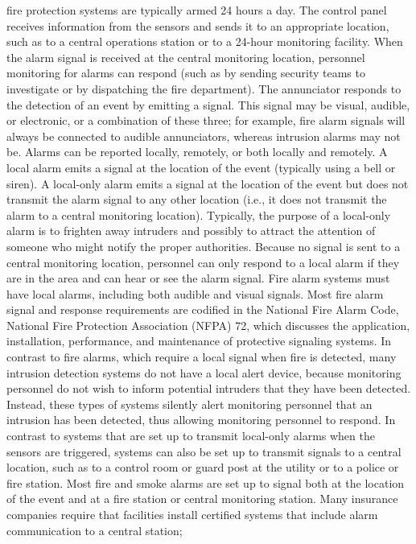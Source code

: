 \documentclass{article}
\begin{document}
fire protection systems are typically armed 24 hours a day. The control
panel receives information from the sensors and sends it to an
appropriate location, such as to a central operations station or to a
24-hour monitoring facility. When the alarm signal is received at the
central monitoring location, personnel monitoring for alarms can respond
(such as by sending security teams to investigate or by dispatching the
fire department). The annunciator responds to the detection of an event
by emitting a signal. This signal may be visual, audible, or electronic,
or a combination of these three; for example, fire alarm signals will
always be connected to audible annunciators, whereas intrusion alarms
may not be. Alarms can be reported locally, remotely, or both locally
and remotely. A local alarm emits a signal at the location of the event
(typically using a bell or siren). A local-only alarm emits a signal at
the location of the event but does not transmit the alarm signal to any
other location (i.e., it does not transmit the alarm to a central
monitoring location). Typically, the purpose of a local-only alarm is to
frighten away intruders and possibly to attract the attention of someone
who might notify the proper authorities. Because no signal is sent to a
central monitoring location, personnel can only respond to a local alarm
if they are in the area and can hear or see the alarm signal. Fire alarm
systems must have local alarms, including both audible and visual
signals. Most fire alarm signal and response requirements are codified
in the National Fire Alarm Code, National Fire Protection Association
(NFPA) 72, which discusses the application, installation, performance,
and maintenance of protective signaling systems. In contrast to fire
alarms, which require a local signal when fire is detected, many
intrusion detection systems do not have a local alert device, because
monitoring personnel do not wish to inform potential intruders that they
have been detected. Instead, these types of systems silently alert
monitoring personnel that an intrusion has been detected, thus allowing
monitoring personnel to respond. In contrast to systems that are set up
to transmit local-only alarms when the sensors are triggered, systems
can also be set up to transmit signals to a central location, such as to
a control room or guard post at the utility or to a police or fire
station. Most fire and smoke alarms are set up to signal both at the
location of the event and at a fire station or central monitoring
station. Many insurance companies require that facilities install
certified systems that include alarm communication to a central station;
\end{document}
